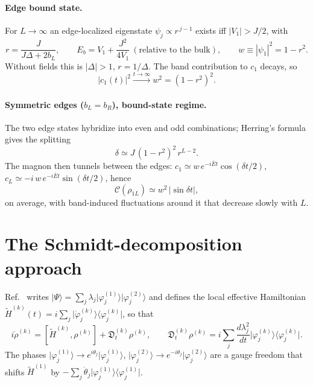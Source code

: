 \documentclass[11pt]{article}
\newcommand{\ket}[1]{\lvert #1\rangle}
\newcommand{\bra}[1]{\langle #1\rvert}
\newcommand{\Ht}{\tilde H}
\begin{document}
\paragraph{Edge bound state.}
For $L\to\infty$ an edge-localized eigenstate $\psi_j\propto r^{\,j-1}$ exists iff $|V_1|>J/2$, with
\begin{equation}
r=\frac{J}{J\Delta+2b_L},\qquad E_b=V_1+\frac{J^2}{4V_1}\ (\text{relative to the bulk}),\qquad w\equiv|\psi_1|^2=1-r^2 .
\end{equation}
Without fields this is $|\Delta|>1$, $r=1/\Delta$. The band contribution to $c_1$ decays, so
\begin{equation}
|c_1(t)|^2\xrightarrow{t\to\infty}w^2=(1-r^2)^2 .
\end{equation}

\paragraph{Symmetric edges ($b_L=b_R$), bound-state regime.}
The two edge states hybridize into even and odd combinations; Herring's formula gives the splitting
\begin{equation}
\delta\simeq J\,(1-r^2)^2\,r^{L-2}.
\end{equation}
The magnon then tunnels between the edges: $c_1\simeq w\,e^{-i\bar Et}\cos(\delta t/2)$, $c_L\simeq -i\,w\,e^{-i\bar Et}\sin(\delta t/2)$, hence
\begin{equation}
\mathcal C(\rho_{1L})\simeq w^2\,\lvert\sin\delta t\rvert ,
\end{equation}
on average, with band-induced fluctuations around it that decrease slowly with $L$.

\section{The Schmidt-decomposition approach}

Ref.~\cite{MB22} writes $\ket{\Psi}=\sum_j\lambda_j\ket{\varphi^{(1)}_j}\ket{\varphi^{(2)}_j}$ and defines the local effective Hamiltonian
$\Ht^{(k)}(t)=i\sum_j\ket{\dot\varphi^{(k)}_j}\bra{\varphi^{(k)}_j}$, so that
\begin{equation}
i\dot\rho^{(k)}=[\Ht^{(k)},\rho^{(k)}]+\mathfrak D^{(k)}_t\rho^{(k)},\qquad
\mathfrak D^{(k)}_t\rho^{(k)}=i\sum_j\frac{d\lambda_j^2}{dt}\ket{\varphi^{(k)}_j}\bra{\varphi^{(k)}_j}.
\end{equation}
The phases $\ket{\varphi^{(1)}_j}\to e^{i\theta_j}\ket{\varphi^{(1)}_j}$, $\ket{\varphi^{(2)}_j}\to e^{-i\theta_j}\ket{\varphi^{(2)}_j}$ are a gauge freedom that shifts $\Ht^{(1)}$ by $-\sum_j\dot\theta_j\ket{\varphi^{(1)}_j}\bra{\varphi^{(1)}_j}$.
\end{document}
